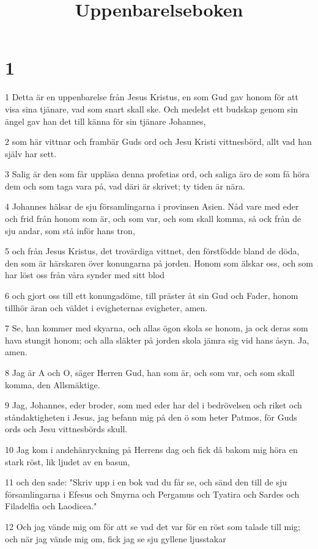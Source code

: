 

\title{Uppenbarelseboken}


\chapter{1}

\par 1 Detta är en uppenbarelse från Jesus Kristus, en som Gud gav honom för att visa sina tjänare, vad som snart skall ske. Och medelst ett budskap genom sin ängel gav han det till känna för sin tjänare Johannes,
\par 2 som här vittnar och frambär Guds ord och Jesu Kristi vittnesbörd, allt vad han själv har sett.
\par 3 Salig är den som får uppläsa denna profetias ord, och saliga äro de som få höra dem och som taga vara på, vad däri är skrivet; ty tiden är nära.
\par 4 Johannes hälsar de sju församlingarna i provinsen Asien. Nåd vare med eder och frid från honom som är, och som var, och som skall komma, så ock från de sju andar, som stå inför hans tron,
\par 5 och från Jesus Kristus, det trovärdiga vittnet, den förstfödde bland de döda, den som är härskaren över konungarna på jorden. Honom som älskar oss, och som har löst oss från våra synder med sitt blod
\par 6 och gjort oss till ett konungadöme, till präster åt sin Gud och Fader, honom tillhör äran och väldet i evigheternas evigheter, amen.
\par 7 Se, han kommer med skyarna, och allas ögon skola se honom, ja ock deras som hava stungit honom; och alla släkter på jorden skola jämra sig vid hans åsyn. Ja, amen.
\par 8 Jag är A och O, säger Herren Gud, han som är, och som var, och som skall komma, den Allsmäktige.
\par 9 Jag, Johannes, eder broder, som med eder har del i bedrövelsen och riket och ståndaktigheten i Jesus, jag befann mig på den ö som heter Patmos, för Guds ords och Jesu vittnesbörds skull.
\par 10 Jag kom i andehänryckning på Herrens dag och fick då bakom mig höra en stark röst, lik ljudet av en basun,
\par 11 och den sade: "Skriv upp i en bok vad du får se, och sänd den till de sju församlingarna i Efesus och Smyrna och Pergamus och Tyatira och Sardes och Filadelfia och Laodicea."
\par 12 Och jag vände mig om för att se vad det var för en röst som talade till mig; och när jag vände mig om, fick jag se sju gyllene ljusstakar
